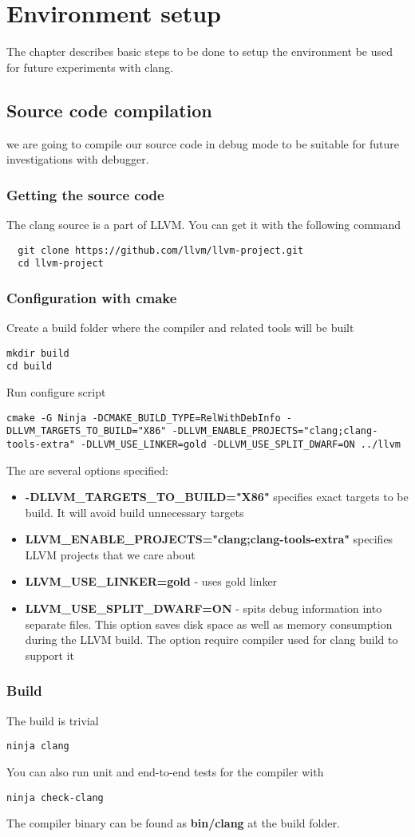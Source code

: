 \chapter{Environment setup}

The chapter describes basic steps to be done to setup the environment
be used for future experiments with clang.

\section{Source code compilation}

we are going to compile our source code in debug mode to be suitable
for future investigations with debugger.

\subsection{Getting the source code}

The clang source is a part of LLVM. You can get it with the following
command
\begin{verbatim}
  git clone https://github.com/llvm/llvm-project.git
  cd llvm-project
\end{verbatim}

\subsection{Configuration with cmake}
Create a build folder where the compiler and related tools will be
built
\begin{verbatim}
mkdir build
cd build
\end{verbatim}
Run configure script
\begin{verbatim}
cmake -G Ninja -DCMAKE_BUILD_TYPE=RelWithDebInfo -DLLVM_TARGETS_TO_BUILD="X86" -DLLVM_ENABLE_PROJECTS="clang;clang-tools-extra" -DLLVM_USE_LINKER=gold -DLLVM_USE_SPLIT_DWARF=ON ../llvm
\end{verbatim}
The are several options specified:
\begin{itemize}
  \item \textbf{-DLLVM\_TARGETS\_TO\_BUILD="X86"} specifies exact
    targets to be build. It will avoid build unnecessary targets
  \item \textbf{LLVM\_ENABLE\_PROJECTS="clang;clang-tools-extra"}
    specifies LLVM projects that we care about
\item \textbf{LLVM\_USE\_LINKER=gold} - uses gold linker
\item \textbf{LLVM\_USE\_SPLIT\_DWARF=ON} - spits debug information into
  separate files. This option saves disk space as well as memory
  consumption during the LLVM build. The option require compiler used
  for clang build to support it
\end{itemize}


\subsection{Build}
The build is trivial
\begin{verbatim}
ninja clang
\end{verbatim}
You can also run unit and end-to-end tests for the compiler with
\begin{verbatim}
ninja check-clang
\end{verbatim}
The compiler binary can be found as \textbf{bin/clang} at the build folder. 
